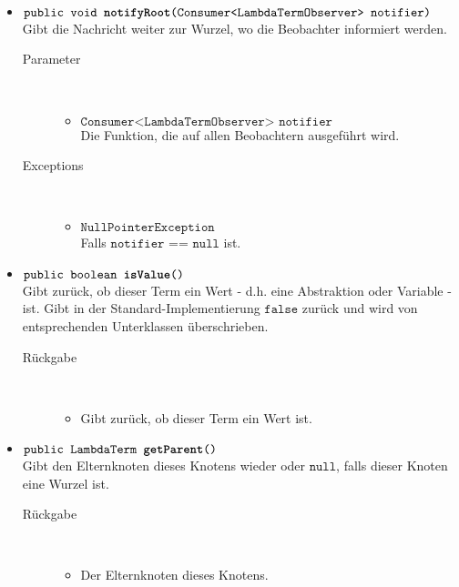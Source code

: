 \begin{description}
\begin{itemize}
		\item $\texttt{public void \textbf{notifyRoot}(Consumer<LambdaTermObserver> notifier)}$ \\ Gibt die Nachricht weiter zur Wurzel, wo die Beobachter informiert werden.
		\begin{description}
			\item[Parameter] \hfill \\
			\vspace{-.8cm}
			\begin{itemize}
				\item $\texttt{Consumer<LambdaTermObserver> notifier}$ \\ Die Funktion, die auf allen Beobachtern ausgeführt wird.
			\end{itemize}
			\item[Exceptions] \hfill \\
			\vspace{-.8cm}
			\begin{itemize}
				\item $\texttt{NullPointerException}$ \\ Falls $\texttt{notifier == null}$ ist.
			\end{itemize}
		\end{description}
		
		\item $\texttt{public boolean \textbf{isValue}()}$ \\ Gibt zurück, ob dieser Term ein Wert - d.h. eine Abstraktion oder Variable - ist. Gibt in der Standard-Implementierung $\texttt{false}$ zurück und wird von entsprechenden Unterklassen überschrieben.
		\begin{description}
			\item[Rückgabe] \hfill \\
			\vspace{-.8cm}
			\begin{itemize}
				\item Gibt zurück, ob dieser Term ein Wert ist.
			\end{itemize}
		\end{description}
		
		\item $\texttt{public LambdaTerm \textbf{getParent}()}$ \\ Gibt den Elternknoten dieses Knotens wieder oder $\texttt{null}$, falls dieser Knoten eine Wurzel ist.
		\begin{description}
			\item[Rückgabe] \hfill \\
			\vspace{-.8cm}
			\begin{itemize}
				\item Der Elternknoten dieses Knotens.
			\end{itemize}
		\end{description}
		

\end{itemize}
\end{description}
